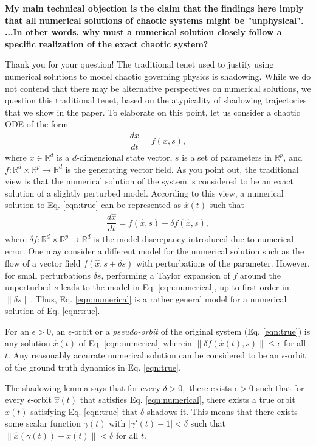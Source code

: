 \documentclass[11pt]{article}
\newcommand{\reviewerTwo}[1]{{\color{azure}\textbf{#1}}}
\begin{document}
\reviewerTwo{My main technical objection is the claim that the findings here imply that all numerical solutions of chaotic systems might be "unphysical". ...In other words, why must a numerical solution closely follow a specific realization of the exact chaotic system? }

Thank you for your question! The traditional tenet used to justify using numerical solutions to model chaotic governing physics is shadowing. While we do not contend that there may be alternative perspectives on numerical solutions, we question this traditional tenet, based on the atypicality of shadowing trajectories that we show in the paper. To elaborate on this point, let us consider a chaotic ODE of the form 
\begin{align}
\label{eqn:true}
    \dfrac{d x}{dt} = f(x, s),
\end{align}
where $x \in \mathbb{R}^d$ is a $d$-dimensional state vector, $s$ is a set of
parameters in $\mathbb{R}^p$, and $f:\mathbb{R}^d \times \mathbb{R}^p \to \mathbb{R}^d$ is the generating vector field. As you point out, the traditional view is that the numerical solution of the system is considered to be an exact solution of a slightly perturbed model. According to this view, a numerical solution to Eq. \ref{eqn:true} can be represented as $\hat{x}(t)$ such that 
\begin{align}
\label{eqn:numerical}
    \dfrac{d\hat{x}}{dt} = f(\hat{x}, s) + \delta f(\hat{x},s), 
\end{align}
where $\delta f:\mathbb{R}^d \times \mathbb{R}^p \to \mathbb{R}^d$ is the model discrepancy introduced due to numerical error. One may consider a different model for the numerical solution such as the flow of a vector field $f(\hat{x}, s + \delta s)$ with perturbations of the parameter. However, for small perturbations $\delta s$, performing a Taylor expansion of $f$ around the unperturbed $s$ leads to the model in Eq. \ref{eqn:numerical}, up to first order in $\|\delta s\|$. Thus, Eq. \ref{eqn:numerical} is a rather general model for a numerical solution of Eq. \ref{eqn:true}.

For an $\epsilon >0$, an $\epsilon$-orbit or a {\em pseudo-orbit} of the original system (Eq. \ref{eqn:true}) is any solution $\hat{x}(t)$ of Eq. \ref{eqn:numerical} wherein $\|\delta f(\hat{x}(t), s)\| \leq \epsilon$ for all $t$. Any reasonably accurate numerical solution can be considered to be an $\epsilon$-orbit of the ground truth dynamics in Eq. \ref{eqn:true}.

The shadowing lemma says that for every $\delta > 0,$ there exists $\epsilon > 0$ such that for every $\epsilon$-orbit $\hat{x}(t)$ that satisfies Eq. \ref{eqn:numerical}, there exists a true orbit $x(t)$ satisfying Eq. \ref{eqn:true} that $\delta$-shadows it. This means that there exists some scalar function $\gamma(t)$ with $|\gamma'(t) - 1| < \delta$ such that $\| \hat{x}(\gamma(t)) - x(t) \| < \delta$ for all $t.$
\end{document}
